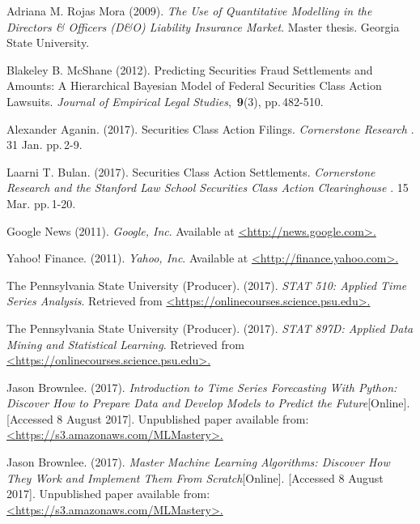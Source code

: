{ Adriana M. Rojas Mora} (2009).
 {\em The Use of Quantitative Modelling in the Directors \& Officers (D\&O) Liability Insurance Market\/}. Master thesis. Georgia State University.

{ Blakeley B. McShane} (2012).
Predicting Securities Fraud Settlements and Amounts: A Hierarchical Bayesian Model of Federal Securities Class Action Lawsuits. {\em Journal of Empirical Legal Studies\/}, \,{\bf 9}(3), pp.\,482-510.

{ Alexander Aganin}. (2017).
Securities Class Action Filings. {\em Cornerstone Research  \/}. 31 Jan. pp.\,2-9.

{ Laarni T. Bulan}. (2017).
Securities Class Action Settlements. {\em Cornerstone Research and the Stanford Law School Securities Class Action Clearinghouse \/}. 15 Mar. pp.\,1-20.

{ Google News} (2011). {\em Google, Inc\/}. Available at  \href{https://news.google.com/news/headlines?ned=uk&hl=en-GB}{\colorbox{Graylight}{<http://news.google.com>.}}

{ Yahoo! Finance}. (2011). {\em Yahoo, Inc\/}. Available at \href{https://finance.yahoo.com/lookup}{\colorbox{Graylight}{<http://finance.yahoo.com>.}}

{The Pennsylvania State University (Producer)}. (2017).
{\em STAT 510: Applied Time Series Analysis\/}. Retrieved from \href{https://onlinecourses.science.psu.edu/stat510/node/33}{\colorbox{Graylight}{<https://onlinecourses.science.psu.edu>.}}

{The Pennsylvania State University (Producer)}. (2017).
{\em STAT 897D: Applied Data Mining and Statistical Learning\/}. Retrieved from \href{https://onlinecourses.science.psu.edu/stat510/node/33}{\colorbox{Graylight}{<https://onlinecourses.science.psu.edu>.}}

{Jason Brownlee}. (2017).
{\em Introduction to Time Series Forecasting With Python: Discover How to Prepare Data and Develop Models to Predict the Future\/}[Online]. [Accessed 8 August 2017]. Unpublished paper available from: \href{https://s3.amazonaws.com/MLMastery/time_series_forecasting_with_python_sample.pdf}{\colorbox{Graylight}{<https://s3.amazonaws.com/MLMastery>.}}

{Jason Brownlee}. (2017).
{\em Master Machine Learning Algorithms: Discover How They Work and Implement Them From Scratch\/}[Online]. [Accessed 8 August 2017]. Unpublished paper available from: \href{https://s3.amazonaws.com/MLMastery/master_machine_learning_algorithms_sample.pdf}{\colorbox{Graylight}{<https://s3.amazonaws.com/MLMastery>.}}

